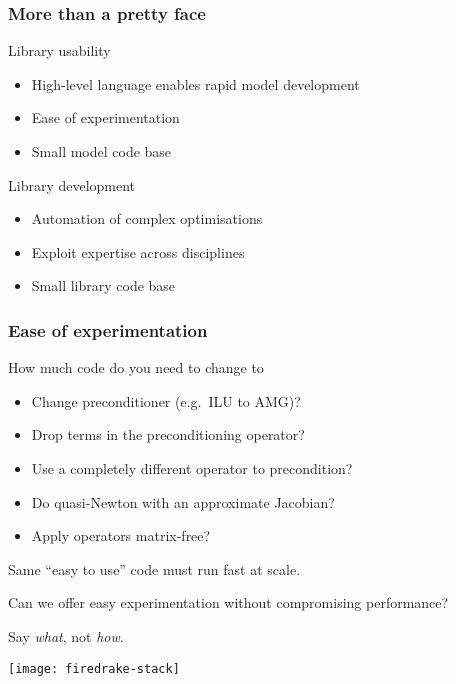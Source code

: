 \documentclass[presentation]{beamer}
\begin{document}
\begin{frame}
  \frametitle{More than a pretty face}

  \begin{block}{Library usability}
    \begin{itemize}
    \item High-level language enables rapid model development
    \item Ease of experimentation
    \item Small model code base
    \end{itemize}
  \end{block}

  \begin{block}{Library development}
    \begin{itemize}
    \item Automation of complex optimisations
    \item Exploit expertise across disciplines
    \item Small library code base
    \end{itemize}
  \end{block}
\end{frame}

\begin{frame}
  \frametitle{Ease of experimentation}
  How much code do you need to change to
  \begin{itemize}
  \item Change preconditioner (e.g.~ILU to AMG)?
  \item Drop terms in the preconditioning operator?
  \item Use a completely different operator to precondition?
  \item Do quasi-Newton with an approximate Jacobian?
  \item Apply operators matrix-free?
  \end{itemize}

  Same ``easy to use'' code must run fast at scale.
\end{frame}

\begin{frame}[standout]
  Can we offer easy experimentation without compromising
  performance?
\end{frame}

\begin{frame}[standout]
  Say \emph{what}, not \emph{how}.
\end{frame}

\begin{frame}
  \texttt{[image: firedrake-stack]}
\end{frame}
\end{document}
